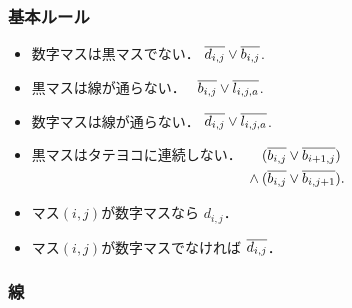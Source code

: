 \documentclass[a4j]{jarticle}
\newcommand{\N}[1]{\overline{#1\vphantom{l}}}
\newcommand{\←}{{\leftarrow}}
\newcommand{\→}{{\rightarrow}}
\newcommand{\↑}{{\uparrow}}
\newcommand{\↓}{{\downarrow}}
\begin{document}
\subsubsection{基本ルール}
\begin{itemize}
\item 数字マスは黒マスでない．
  $\N{d_{i,j}}\lor\N{b_{i,j}}$.


\item 黒マスは線が通らない．　
  $\N{b_{i,j}}\lor\N{l_{i,j,a}}$.

\item 数字マスは線が通らない．
  $\N{d_{i,j}}\lor\N{l_{i,j,a}}$.

\item 黒マスはタテヨコに連続しない．
  $\begin{aligned}[t]
   & (\N{b_{i,j}}\lor\N{b_{i+1,j}}) \\
   {}\land{}
   & (\N{b_{i,j}}\lor\N{b_{i,j+1}}).
  \end{aligned}$

\item マス$(i,j)$が数字マスなら $d_{i,j}$．
\item マス$(i,j)$が数字マスでなければ $\N{d_{i,j}}$．
\end{itemize}

\subsubsection{線}
\end{document}
